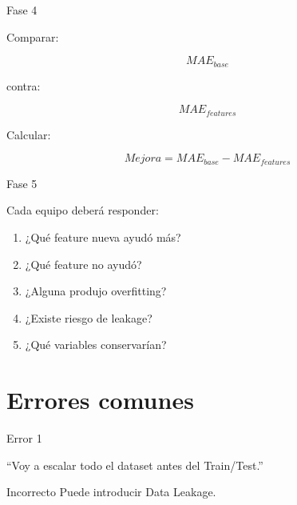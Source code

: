 \documentclass[aspectratio=169,11pt]{beamer}
\begin{document}

\begin{frame}{Fase 4}

Comparar:

\[
MAE_{base}
\]

contra:

\[
MAE_{features}
\]

Calcular:

\[
Mejora
=
MAE_{base}
-
MAE_{features}
\]

\end{frame}


\begin{frame}{Fase 5}

Cada equipo deberá responder:

\begin{enumerate}

    \item ¿Qué feature nueva ayudó más?

    \item ¿Qué feature no ayudó?

    \item ¿Alguna produjo overfitting?

    \item ¿Existe riesgo de leakage?

    \item ¿Qué variables conservarían?

\end{enumerate}

\end{frame}

\section{Errores comunes}

\begin{frame}{Error 1}

\begin{center}

\Large
``Voy a escalar todo el dataset
antes del Train/Test.''
\end{center}

\vspace{0.5cm}

\begin{alertblock}{Incorrecto}
Puede introducir Data Leakage.
\end{alertblock}

\end{frame}
\end{document}

